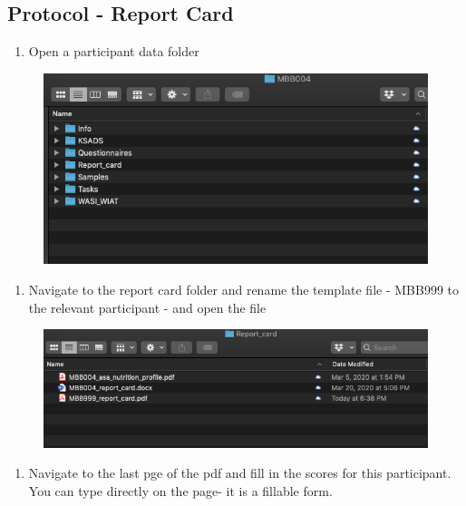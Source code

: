 \documentclass[]{book}
\providecommand{\tightlist}{%
  \setlength{\itemsep}{0pt}\setlength{\parskip}{0pt}}
\begin{document}
\hypertarget{protocol---report-card}{%
\subsection{Protocol - Report Card}\label{protocol---report-card}}

\begin{enumerate}
\def\labelenumi{\arabic{enumi}.}
\tightlist
\item
  Open a participant data folder
\end{enumerate}

\begin{figure}
\centering
\includegraphics{images/report_card_online/1.png}
\caption{}
\end{figure}

\begin{enumerate}
\def\labelenumi{\arabic{enumi}.}
\setcounter{enumi}{1}
\tightlist
\item
  Navigate to the report card folder and rename the template file - MBB999 to the relevant participant - and open the file
\end{enumerate}

\begin{figure}
\centering
\includegraphics{images/report_card_online/2.png}
\caption{}
\end{figure}

\begin{enumerate}
\def\labelenumi{\arabic{enumi}.}
\setcounter{enumi}{2}
\tightlist
\item
  Navigate to the last pge of the pdf and fill in the scores for this participant. You can type directly on the page- it is a fillable form.
\end{enumerate}
\end{document}
